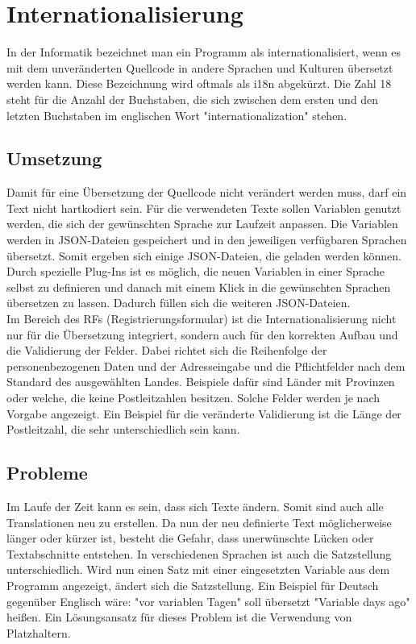 \chapter{Internationalisierung}
In der Informatik bezeichnet man ein Programm als internationalisiert, wenn es mit dem unveränderten Quellcode in andere Sprachen und Kulturen übersetzt werden kann. Diese Bezeichnung wird oftmals als i18n abgekürzt. Die Zahl 18 steht für die Anzahl der Buchstaben, die sich zwischen dem ersten und den letzten Buchstaben im englischen Wort "internationalization" stehen. \autocite{wikii18n}
\section{Umsetzung}
Damit für eine Übersetzung der Quellcode nicht verändert werden muss, darf ein Text nicht hartkodiert sein. Für die verwendeten Texte sollen Variablen genutzt werden, die sich der gewünschten Sprache zur Laufzeit anpassen. Die Variablen werden in JSON-Dateien gespeichert und in den jeweiligen verfügbaren Sprachen übersetzt. Somit ergeben sich einige JSON-Dateien, die geladen werden können. Durch spezielle Plug-Ins ist es möglich, die neuen Variablen in einer Sprache selbst zu definieren und danach mit einem Klick in die gewünschten Sprachen übersetzen zu lassen. Dadurch füllen sich die weiteren JSON-Dateien.\autocite{wikii18n}\\
Im Bereich des RFs (Registrierungsformular) ist die Internationalisierung nicht nur für die Übersetzung integriert, sondern auch für den korrekten Aufbau und die Validierung der Felder. Dabei richtet sich die Reihenfolge der personenbezogenen Daten und der Adresseingabe und die Pflichtfelder nach dem Standard des ausgewählten Landes. Beispiele dafür sind Länder mit Provinzen oder welche, die keine Postleitzahlen besitzen. Solche Felder werden je nach Vorgabe angezeigt. Ein Beispiel für die veränderte Validierung ist die Länge der Postleitzahl, die sehr unterschiedlich sein kann.\autocite{wikii18n}
\section{Probleme}
Im Laufe der Zeit kann es sein, dass sich Texte ändern. Somit sind auch alle Translationen neu zu erstellen. Da nun der neu definierte Text möglicherweise länger oder kürzer ist, besteht die Gefahr, dass unerwünschte Lücken oder Textabschnitte entstehen. In verschiedenen Sprachen ist auch die Satzstellung unterschiedlich. Wird nun einen Satz mit einer eingesetzten Variable aus dem Programm angezeigt, ändert sich die Satzstellung. Ein Beispiel für Deutsch gegenüber Englisch wäre: "vor {variablen} Tagen" soll übersetzt "{Variable} days ago" heißen. Ein Lösungsansatz für dieses Problem ist die Verwendung von Platzhaltern.\autocite{wikii18n}